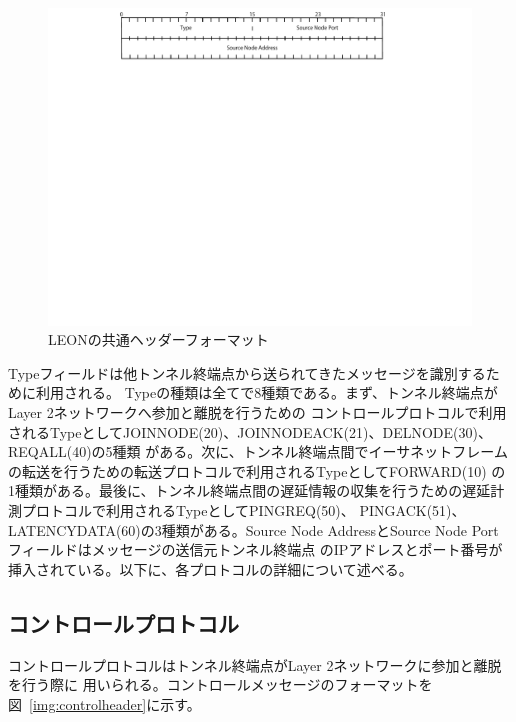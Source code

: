 \begin{figure}[h]
	\begin{center}
		\includegraphics[scale=1.0]{./img/mtunheader}
		\caption{LEONの共通ヘッダーフォーマット}
		\label{img:mtunheader}
	\end{center}
\end{figure}

Typeフィールドは他トンネル終端点から送られてきたメッセージを識別するために利用される。
Typeの種類は全てで8種類である。まず、トンネル終端点がLayer 2ネットワークへ参加と離脱を行うための
コントロールプロトコルで利用されるTypeとしてJOINNODE(20)、JOINNODEACK(21)、DELNODE(30)、REQALL(40)の5種類
がある。次に、トンネル終端点間でイーサネットフレームの転送を行うための転送プロトコルで利用されるTypeとしてFORWARD(10)
の1種類がある。最後に、トンネル終端点間の遅延情報の収集を行うための遅延計測プロトコルで利用されるTypeとしてPINGREQ(50)、
PINGACK(51)、LATENCYDATA(60)の3種類がある。Source Node AddressとSource Node Portフィールドはメッセージの送信元トンネル終端点
のIPアドレスとポート番号が挿入されている。以下に、各プロトコルの詳細について述べる。

\subsection{コントロールプロトコル}
\label{solv:controlprotocol}

コントロールプロトコルはトンネル終端点がLayer 2ネットワークに参加と離脱を行う際に
用いられる。コントロールメッセージのフォーマットを図~\ref{img:controlheader}に示す。

